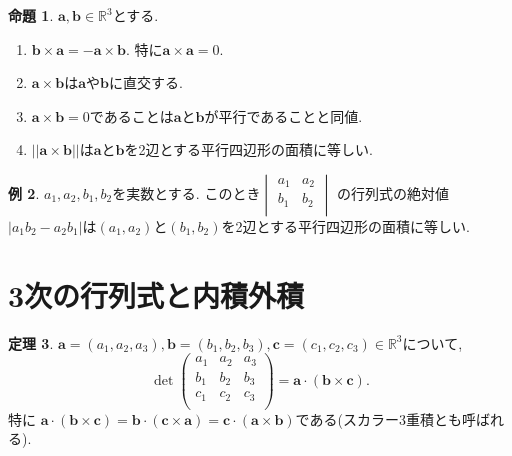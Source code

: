 \documentclass[dvipdfmx,a4paper,11pt]{article}
\newcommand{\R}{\mathbb{R}}
\theoremstyle{definition}
\newtheorem{thm}{定理}
\newtheorem{prop}[thm]{命題}
\newtheorem{exa}[thm]{例}
\begin{document}
 \begin{tcolorbox}[
    colback = white,
    colframe = green!35!black,
    fonttitle = \bfseries,
    breakable = true]
    \begin{prop}
$\bm{a}, \bm{b} \in \R^3$とする.
\begin{enumerate}
\item $\bm{b} \times  \bm{a}  = - \bm{a} \times  \bm{b}$. 特に$\bm{a} \times  \bm{a} =0$.
\item $\bm{a} \times  \bm{b}$は$\bm{a} $や$\bm{b}$に直交する.
\item $\bm{a} \times  \bm{b} =0$であることは$\bm{a} $と$\bm{b}$が平行であることと同値.
\item $|| \bm{a} \times  \bm{b}||$は$\bm{a} $と$\bm{b}$を2辺とする平行四辺形の面積に等しい.
\end{enumerate}
    \end{prop}
 \end{tcolorbox}
 
 
\begin{exa}
$a_1, a_2, b_1,b_2$を実数とする. 
このとき$\begin{vmatrix}
a_1&a_2 \\
b_1&b_2\\
\end{vmatrix}$
の行列式の絶対値$|a_1b_2 - a_2b_1|$は$(a_1, a_2)$と$(b_1, b_2)$を2辺とする平行四辺形の面積に等しい.

\end{exa}
\section{3次の行列式と内積外積}

\begin{tcolorbox}[
    colback = white,
    colframe = green!35!black,
    fonttitle = \bfseries,
    breakable = true]
    \begin{thm}
$\bm{a}=(a_1, a_2, a_3), \bm{b}=(b_1, b_2, b_3), \bm{c}=(c_1, c_2, c_3)\in \R^3$について, 
$$
\det
\begin{pmatrix}
a_1& a_2 & a_3\\
b_1& b_2 & b_3\\
c_1& c_2 & c_3\\
\end{pmatrix}
=\bm{a} \cdot (\bm{b} \times \bm{c}).
$$
特に
$\bm{a} \cdot (\bm{b} \times \bm{c}) = \bm{b} \cdot (\bm{c} \times \bm{a})=\bm{c} \cdot (\bm{a} \times \bm{b})$である(スカラー3重積とも呼ばれる).
\end{thm}
 \end{tcolorbox}
 
\end{document}
